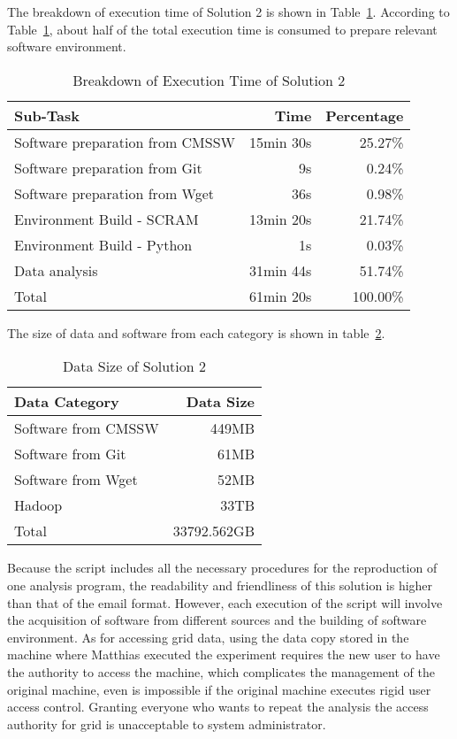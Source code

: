 \documentclass{acm_proc_article-sp}
\begin{document}
The breakdown of execution time of Solution 2 is shown in Table~\ref{table:time-2nd}. According to Table~\ref{table:time-2nd}, about half of the total execution time is consumed to prepare relevant software environment.

\begin{table}
    \centering
    \begin{tabular}{|l|r|r|}
    \hline
    Sub-Task & Time & Percentage \\ \hline
    Software preparation from CMSSW & 15min 30s & 25.27\% \\ \hline
    Software preparation from Git & 9s & 0.24\% \\ \hline
    Software preparation from Wget & 36s & 0.98\% \\ \hline
    Environment Build - SCRAM & 13min 20s & 21.74\% \\ \hline
    Environment Build - Python & 1s & 0.03\% \\ \hline
    Data analysis & 31min 44s & 51.74\% \\ \hline
    Total & 61min 20s & 100.00\% \\ \hline
    \end{tabular}
    \caption{Breakdown of Execution Time of Solution 2}
    \label{table:time-2nd}
\end{table}

The size of data and software from each category is shown in table~\ref{table:datasize-2nd}.

\begin{table}
    \centering
    \begin{tabular}{|l|r|}
    \hline
    Data Category & Data Size \\ \hline
    Software from CMSSW & 449MB \\ \hline
    Software from Git & 61MB \\ \hline
    Software from Wget & 52MB \\ \hline
    Hadoop & 33TB \\ \hline
    Total & 33792.562GB \\ \hline
    \end{tabular}
    \caption{Data Size of Solution 2}
    \label{table:datasize-2nd}
\end{table}

Because the script includes all the necessary procedures for the reproduction of one analysis program, the readability and friendliness of this solution is higher than that of the email format. However, each execution of the script will involve the acquisition of software from different sources and the building of software environment. As for accessing grid data, using the data copy stored in the machine where Matthias executed the experiment requires the new user to have the authority to access the machine, which complicates the management of the original machine, even is impossible if the original machine executes rigid user access control. Granting everyone who wants to repeat the analysis the access authority for grid is unacceptable to system administrator. 
\end{document}
